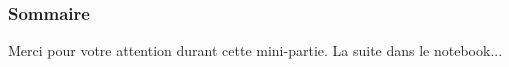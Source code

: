 \documentclass[9pt,xcolor=dvipsnames]{beamer} %
\begin{document}





\begin{frame}
  \small
  \frametitle{Sommaire}
  \tableofcontents
\end{frame}







% 

% 


\begin{frame}
  \Large
  \centering
  Merci pour votre attention durant cette mini-partie. La suite dans le notebook...

\end{frame}

\end{document}
